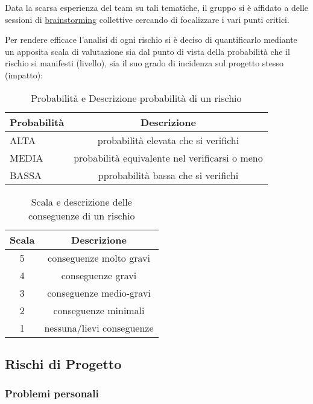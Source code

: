 Data la scarsa esperienza del team su tali tematiche, il gruppo si è affidato a delle sessioni di \underline{brainstorming} collettive cercando di focalizzare i vari punti critici.

Per rendere efficace l'analisi di ogni rischio si è deciso di quantificarlo mediante un apposita scala di valutazione sia dal punto di vista della probabilità che il rischio si manifesti (livello), sia il suo grado di incidenza sul progetto stesso (impatto):

\begin{table}[h!]
\centering
\begin{tabular}{|l|c|}
\hline
Probabilità& Descrizione\\
\hline
ALTA & probabilità elevata che si verifichi\\
MEDIA & probabilità equivalente nel verificarsi o meno\\
BASSA & pprobabilità bassa che si verifichi\\
\hline
\end{tabular}
\caption{Probabilità e Descrizione probabilità di un rischio}\label{tab:livellorischi}
\end{table}
\begin{table}[h!]
\centering
\begin{tabular}{|c|c|}
\hline
Scala& Descrizione  \\
\hline
5 & conseguenze molto gravi\\
4 & conseguenze gravi\\
3 & conseguenze medio-gravi\\
2 & conseguenze minimali\\
1 & nessuna/lievi conseguenze\\
\hline
\end{tabular}
\caption{Scala e descrizione delle conseguenze di un rischio}\label{tab:impattorischi}
\end{table}

\subsection{Rischi di Progetto}

\subsubsection{Problemi personali}


